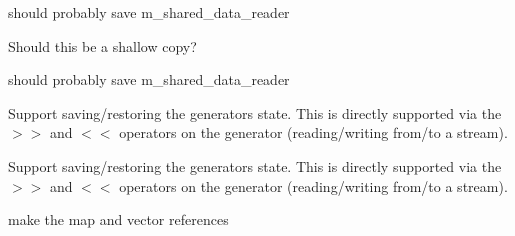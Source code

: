 \begin{DoxyRefList}
\item[\label{todo__todo000025}%
\Hypertarget{todo__todo000025}%
Member \hyperlink{classlbann_1_1generic__target__layer_a2d9f6ac689171acf0caceed3ed4f7ef9}{lbann\+:\+:generic\+\_\+target\+\_\+layer\+:\+:load\+From\+Checkpoint} (int fd, const char $\ast$filename, size\+\_\+t $\ast$bytes) override]should probably save m\+\_\+shared\+\_\+data\+\_\+reader  
\item[\label{todo__todo000022}%
\Hypertarget{todo__todo000022}%
Member \hyperlink{classlbann_1_1generic__target__layer_a7c15e3fe4f1fd7f0ccdbc4c3ed8c793e}{lbann\+:\+:generic\+\_\+target\+\_\+layer\+:\+:operator=} (const \hyperlink{classlbann_1_1generic__target__layer}{generic\+\_\+target\+\_\+layer} \&other)]Should this be a shallow copy?  
\item[\label{todo__todo000024}%
\Hypertarget{todo__todo000024}%
Member \hyperlink{classlbann_1_1generic__target__layer_aff8b79ff0392bd78c44a5a4f6b6ef549}{lbann\+:\+:generic\+\_\+target\+\_\+layer\+:\+:save\+To\+Checkpoint} (int fd, const char $\ast$filename, size\+\_\+t $\ast$bytes) const override]should probably save m\+\_\+shared\+\_\+data\+\_\+reader  
\item[\label{todo__todo000031}%
\Hypertarget{todo__todo000031}%
Member \hyperlink{namespacelbann_a8987701a637ff0e678114aa77e9c4d40}{lbann\+:\+:init\+\_\+data\+\_\+seq\+\_\+random} (int seed)]Support saving/restoring the generator\textquotesingle{}s state. This is directly supported via the $>$$>$ and $<$$<$ operators on the generator (reading/writing from/to a stream).  
\item[\label{todo__todo000030}%
\Hypertarget{todo__todo000030}%
Member \hyperlink{namespacelbann_acef152f20e422b3aea1a3c1691a533ac}{lbann\+:\+:init\+\_\+random} (int seed, \hyperlink{classlbann_1_1lbann__comm}{lbann\+\_\+comm} $\ast$comm)]Support saving/restoring the generator\textquotesingle{}s state. This is directly supported via the $>$$>$ and $<$$<$ operators on the generator (reading/writing from/to a stream).  
\item[\label{todo__todo000021}%
\Hypertarget{todo__todo000021}%
Member \hyperlink{classlbann_1_1input__layer_aad8b042899d86f5b7904d9d2653b5181}{lbann\+:\+:input\+\_\+layer$<$ T\+\_\+io\+\_\+buffer, T\+\_\+layout $>$\+:\+:input\+\_\+layer} (\hyperlink{classlbann_1_1lbann__comm}{lbann\+\_\+comm} $\ast$comm, int num\+\_\+parallel\+\_\+readers, std\+::map$<$ execution\+\_\+mode, generic\+\_\+data\+\_\+reader $\ast$$>$ data\+\_\+readers, bool data\+\_\+set\+\_\+spans\+\_\+models=true, bool for\+\_\+regression=false)]make the map and vector references  
$$
\end{DoxyRefList}
